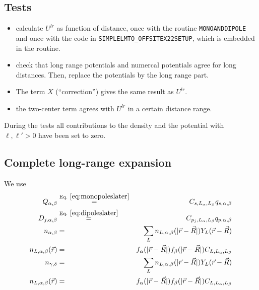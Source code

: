 \documentclass[11pt,a4paper]{report}
\begin{document}
\subsection{Tests}
\begin{itemize}
\item calculate $U^{lr}$ as function of distance, once with the
  routine \verb|MONOANDDIPOLE| and once with the code in
  \verb|SIMPLELMTO_OFFSITEX22SETUP|, which is embedded in the routine.
%
\item check that long range potentials and numercal potentials agree
  for long distances. Then, replace the potentials by the long range
  part.
%
\item The term $X$ (``correction'') gives the same result as $U^{lr}$.
%
\item the two-center term agrees with $U^{lr}$ in a certain distance
  range.
\end{itemize}
During the tests all contributions to the density and the potential
with $\ell,\ell'>0$ have been set to zero.





\subsection{Complete long-range expansion}

We use 
\begin{eqnarray}
Q_{\alpha,\beta}&\eqrel{eq:monopoleslater}{=}&C_{s,L_\alpha,L_\beta}q_{s,\alpha,\beta}
\nonumber\\
D_{j,\alpha,\beta}&\eqrel{eq:dipoleslater}{=}&C_{p_j,L_\alpha,L_\beta}q_{p,\alpha,\beta}
\nonumber\\
n_{\alpha,\beta}&=&\sum_Ln_{L,\alpha,\beta}(|\vec{r}-\vec{R}|) Y_L(\vec{r}-\vec{R})
\nonumber\\
n_{L,\alpha,\beta}(\vec{r})&=& f_{\alpha}(|\vec{r}-\vec{R}|)
f_{\beta}(|\vec{r}-\vec{R}|)C_{L,L_\alpha,L_\beta}
\nonumber\\
n_{\gamma,\delta}&=&\sum_Ln_{L,\alpha,\beta}(|\vec{r}-\vec{R}|) Y_L(\vec{r}-\vec{R})
\nonumber\\
n_{L,\alpha,\beta}(\vec{r})&=& f_{\alpha}(|\vec{r}-\vec{R}|)
f_{\beta}(|\vec{r}-\vec{R}|)C_{L,L_\alpha,L_\beta}
\end{eqnarray}
\end{document}
